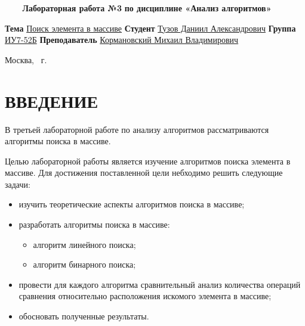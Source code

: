 \documentclass{article}
\begin{document}
\begin{titlepage}
	\noindent\begin{minipage}{1.0\textwidth}\centering
		\Large\textbf{   ~~~ Лабораторная работа №3}\newline
		\textbf{по дисциплине «Анализ алгоритмов»}\newline\newline\newline\newline\newline
	\end{minipage}

	\noindent\textbf{Тема} \underline{Поиск элемента в массиве}\newline\newline
	\textbf{Студент} \underline{Тузов Даниил Александрович}\newline\newline
	\textbf{Группа} \underline{ИУ7-52Б}\newline\newline
	\textbf{Преподаватель} \underline{Кормановский Михаил Владимирович}
	
	\begin{center}
		\vfill
		Москва, \the\year ~г.
	\end{center}
	\restoregeometry
	\clearpage
\end{titlepage}

\renewcommand{\contentsname}{СОДЕРЖАНИЕ} 
\tableofcontents
\setcounter{page}{2}
\clearpage

\section*{ВВЕДЕНИЕ}
В третьей лабораторной работе по анализу алгоритмов рассматриваются алгоритмы поиска в массиве.

Целью лабораторной работы является изучение алгоритмов поиска элемента в массиве.
Для достижения поставленной цели небходимо решить следующие задачи:
\begin{itemize}
	\item изучить теоретические аспекты алгоритмов поиска в массиве;
	\item разработать алгоритмы поиска в массиве:
	\begin{itemize}
		\item алгоритм линейного поиска;
		\item алгоритм бинарного поиска;
	\end{itemize}
	\item провести для каждого алгоритма сравнительный анализ количества операций сравнения относительно 
	расположения искомого элемента в массиве;
	\item обосновать полученные результаты.
\end{itemize}
\end{document}
